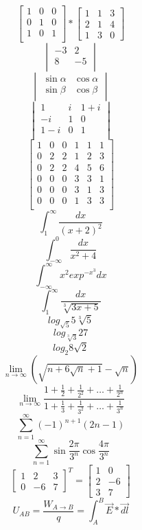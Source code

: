 \documentclass[a4paper]{article}
\begin{document}
$$
\begin{bmatrix}
1&0&0\\
0&1&0\\
1&0&1\\
\end{bmatrix} * \begin{bmatrix}
					1&1&3\\
					2&1&4\\
					1&3&0
				\end{bmatrix}
$$
$$
\begin{vmatrix}
-3&2\\
8&-5\\
\end{vmatrix}
$$
$$
\begin{vmatrix}
\sin\alpha & \cos\alpha\\
\sin\beta & \cos\beta\\
\end{vmatrix}
$$
$$
\begin{vmatrix}
1&i&1+i\\
-i&1&0\\
1-i&0&1\\
\end{vmatrix}
$$
$$
\left[
\begin{array}{c|cc|ccc}
1&0&0&1&1&1\\
\hline
0&2&2&1&2&3\\
0&2&2&4&5&6\\
\hline
0&0&0&3&3&1\\
0&0&0&3&1&3\\
0&0&0&1&3&3\\
\end{array}
\right]
$$
$$\int^\infty_1 \frac{dx}{(x+2)^2}$$
$$\int^0_{-\infty}\frac{dx}{x^2+4}$$
$$\int^\infty_{-\infty}x^2exp^{-x^3}dx$$
$$\int^\infty_1 \frac{dx}{\sqrt[3]{3x+5}}$$
$$log_{\sqrt{5}}5\sqrt[3]{5}$$
$$log_{\sqrt[3]{3}}27$$
$$log_2 8\sqrt{2}$$
$$\lim_{n\to\infty}(\sqrt{n+6\sqrt{n}+1}-\sqrt{n})$$
$$\lim_{n\to\infty} \frac{1+\frac{1}{2}+\frac{1}{2^2}+\ldots+\frac{1}{2^n}}{1+\frac{1}{3}+\frac{1}{3^2}+\ldots+\frac{1}{3^n}}$$
$$\sum_{n=1}^\infty (-1)^{n+1}(2n-1)$$
$$\sum_{n=1}^\infty \sin\frac{2\pi}{3^n}\cos\frac{4\pi}{3^n}$$
$$
\begin{bmatrix}
1&2&3\\
0&-6&7
\end{bmatrix}^T=\begin{bmatrix}
					1&0\\
					2&-6\\
					3&7
				\end{bmatrix}
$$
$$
U_{AB}=\frac{W_{A \to B}}{q} =\int_A^B\vec{E} *\vec{dl}
$$
\end{document}
